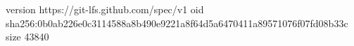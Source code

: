 version https://git-lfs.github.com/spec/v1
oid sha256:0b0ab226e0c3114588a8b490e9221a8f64d5a6470411a89571076f07fd08b33c
size 43840

